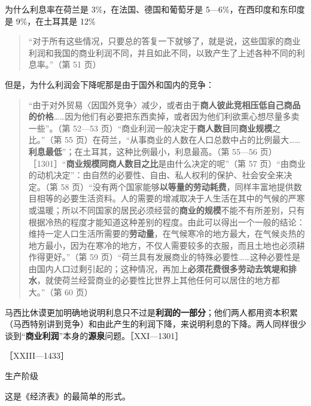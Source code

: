 为什么利息率在荷兰是 3\%，在法国、德国和葡萄牙是 5—6\%，在西印度和东印度是 9\%，在土耳其是 12\%

\begin{quote}“对于所有这些情况，只要总的答复一下就够了，就是说，这些国家的商业利润和我国的商业利润不同，并且如此不同，以致产生了上述各种不同的利息率。”（第 51 页）\end{quote}

但是，为什么利润会下降呢那是由于国外和国内的竞争：

\begin{quote}“由于对外贸易〈因国外竞争〉减少，或者由于\textbf{商人彼此竞相压低自己商品的价格}……因为他们有必要把东西卖掉，或者因为他们利欲熏心想尽量多卖一些”。（第 52—53 页）“商业利润一般决定于\textbf{商人数目}同\textbf{商业规模}之比。”（第 55 页）在荷兰，“从事商业的人数在人口总数中占的比例最大……\textbf{利息最低}”；在土耳其，这种比例最小，利息最高。（第 55—56 页）［1301］“\textbf{商业规模同商人数目之比}是由什么决定的呢”（第 57 页）“由商业的动机决定”：由自然的必要性、自由、私人权利的保护、社会安全来决定。（第 58 页）“没有两个国家能够\textbf{以等量的劳动耗费}，同样丰富地提供数目相等的必要生活资料。人的需要的增减取决于人生活在其中的气候的严寒或温暖；所以不同国家的居民必须经营的\textbf{商业的规模}不能不有所差别，只有根据冷热的程度才能知道这种差别的程度。由此可以得出一个一般的结论：维持一定人口生活所需要的\textbf{劳动量}，在气候寒冷的地方最大，在气候炎热的地方最小，因为在寒冷的地方，不仅人需要较多的衣服，而且土地也必须耕作得更好。”（第 59 页）“荷兰具有发展商业的特殊必要性……这种必要性是由国内人口过剩引起的；这种情况，再加上\textbf{必须花费很多劳动去筑堤和排水}，就使荷兰经营商业的必要性比世界上其他任何可以居住的地方都大。”（第 60 页）\end{quote}


马西比休谟更加明确地说明利息只不过是\textbf{利润的一部分}；他们两人都用资本积累（马西特别讲到竞争）和由此产生的利润下降，来说明利息的下降。两人同样很少谈到“\textbf{商业利润}”本身的\textbf{源泉}问题。［XXI—1301］



［XXIII—1433］

生产阶级

这是《经济表》的最简单的形式。

